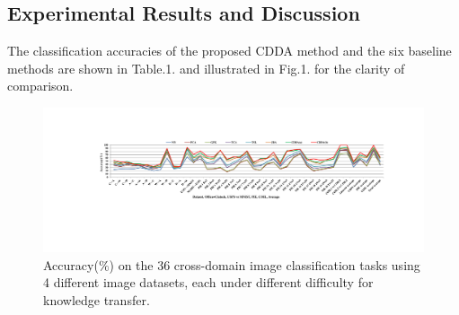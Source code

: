 \documentclass[10pt,twocolumn,letterpaper]{article}
\begin{document}
\begin{CJK*}{UTF8}{gkai}
\subsection{Experimental Results and Discussion}
The classification accuracies of the proposed CDDA method and the six baseline methods  are shown in Table.1. and illustrated  in Fig.1. for the clarity of comparison. 
\begin{figure}[h!]
	\centering
	\label{fig:acc}
	\includegraphics[width=1\linewidth]{1.pdf}
	\vspace{-7pt}
	\caption { Accuracy($\% $) on the 36 cross-domain image classification tasks using 4 different image datasets, each under different difficulty for knowledge transfer. } 
\end{figure} 
\begin{table}[h!]
	\centering
	\label{tab:acc}
	\caption{Quantitative comparisons with the baseline methods: Accuracy($\% $) on 36 cross-domain image classifications on four different datasets}
	\vspace{1pt}
\end{table}
\end{CJK*}
\end{document}
